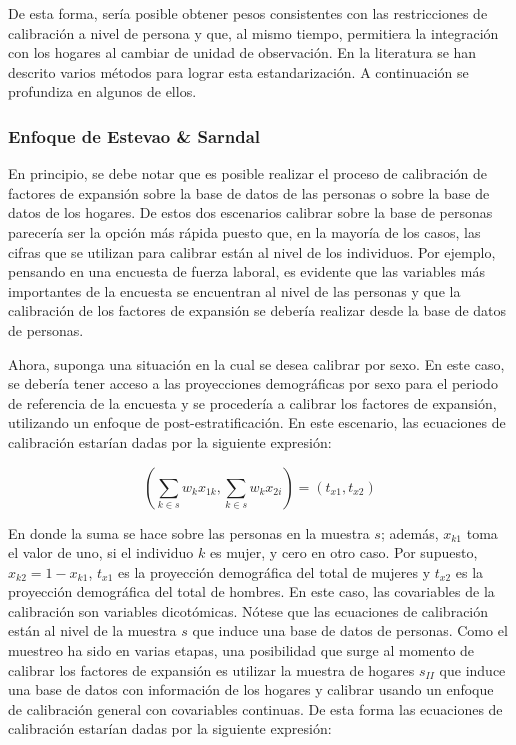 \documentclass[
  12pt,
]{book}
\begin{document}
De esta forma, sería posible obtener pesos consistentes con las restricciones de calibración a nivel de persona y que, al mismo tiempo, permitiera la integración con los hogares al cambiar de unidad de observación. En la literatura se han descrito varios métodos para lograr esta estandarización. A continuación se profundiza en algunos de ellos.

\hypertarget{enfoque-de-estevao-sarndal}{%
\subsubsection{Enfoque de Estevao \& Sarndal}\label{enfoque-de-estevao-sarndal}}

En principio, se debe notar que es posible realizar el proceso de calibración de factores de expansión sobre la base de datos de las personas o sobre la base de datos de los hogares. De estos dos escenarios calibrar sobre la base de personas parecería ser la opción más rápida puesto que, en la mayoría de los casos, las cifras que se utilizan para calibrar están al nivel de los individuos. Por ejemplo, pensando en una encuesta de fuerza laboral, es evidente que las variables más importantes de la encuesta se encuentran al nivel de las personas y que la calibración de los factores de expansión se debería realizar desde la base de datos de personas.

Ahora, suponga una situación en la cual se desea calibrar por sexo. En este caso, se debería tener acceso a las proyecciones demográficas por sexo para el periodo de referencia de la encuesta y se procedería a calibrar los factores de expansión, utilizando un enfoque de post-estratificación. En este escenario, las ecuaciones de calibración estarían dadas por la siguiente expresión:

\[
\left ( \sum_{k \in s} w_k x_{1k}, \sum_{k \in s} w_k x_{2i} \right )=(t_{x1}, t_{x2})
\]

En donde la suma se hace sobre las personas en la muestra \(s\); además, \(x_{k1}\) toma el valor de uno, si el individuo \(k\) es mujer, y cero en otro caso. Por supuesto, \(x_{k2} = 1 - x_{k1}\), \(t_{x1}\) es la proyección demográfica del total de mujeres y \(t_{x2}\) es la proyección demográfica del total de hombres. En este caso, las covariables de la calibración son variables dicotómicas. Nótese que las ecuaciones de calibración están al nivel de la muestra \(s\) que induce una base de datos de personas. Como el muestreo ha sido en varias etapas, una posibilidad que surge al momento de calibrar los factores de expansión es utilizar la muestra de hogares \(s_{II}\) que induce una base de datos con información de los hogares y calibrar usando un enfoque de calibración general con covariables continuas. De esta forma las ecuaciones de calibración estarían dadas por la siguiente expresión:
\end{document}
